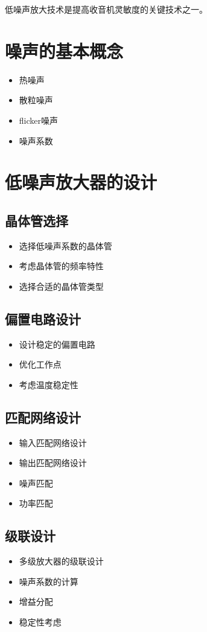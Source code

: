 \documentclass[12pt,UTF8]{ctexbook}
\begin{document}
低噪声放大技术是提高收音机灵敏度的关键技术之一。

\section{噪声的基本概念}\begin{itemize}
  \item 热噪声
  \item 散粒噪声
  \item  flicker噪声
  \item 噪声系数\end{itemize}

\section{低噪声放大器的设计}

\subsection{晶体管选择}\begin{itemize}
  \item 选择低噪声系数的晶体管
  \item 考虑晶体管的频率特性
  \item 选择合适的晶体管类型\end{itemize}

\subsection{偏置电路设计}\begin{itemize}
  \item 设计稳定的偏置电路
  \item 优化工作点
  \item 考虑温度稳定性\end{itemize}

\subsection{匹配网络设计}\begin{itemize}
  \item 输入匹配网络设计
  \item 输出匹配网络设计
  \item 噪声匹配
  \item 功率匹配\end{itemize}

\subsection{级联设计}\begin{itemize}
  \item 多级放大器的级联设计
  \item 噪声系数的计算
  \item 增益分配
  \item 稳定性考虑\end{itemize}
\end{document}

